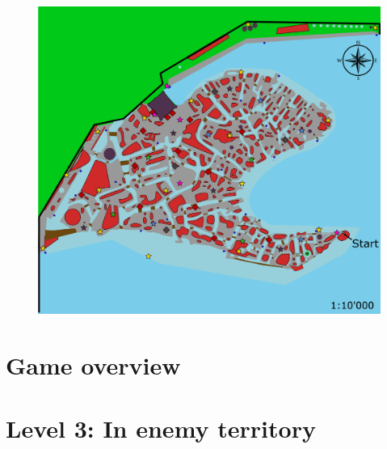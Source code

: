 \documentclass[12pt,twoside,openright]{report}
\begin{document}
\clearpage
\newpage
\thispagestyle{empty}{}
\mbox{~}
\clearpage
\newpage
\setcounter{page}{1}

\vspace*{20pt}



\begin{figure}[H]
  \centering
  \includegraphics[width=\textwidth]{Images/Maps/dynamiaCover}
\end{figure}





\tableofcontents

\part{Game overview}











\part{Level 3: In enemy territory}










\end{document}
